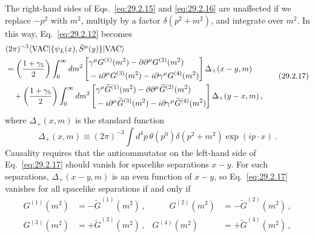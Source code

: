 The right-hand sides of Eqs.~\eqref{eq:29.2.15} and
\eqref{eq:29.2.16} are unaffected if we replace \(-p^2\) with \(m^2\),
multiply by a factor \(\delta(p^2+m^2)\), and integrate over \(m^2\).
In this way, Eq.~\eqref{eq:29.2.12} becomes
\begin{equation}
  \begin{aligned}
  &(2\pi)^{-3}
  \langle\mathrm{VAC}\lvert
    \{\psi_L(x),\bar S^\mu(y)\}
  \rvert\mathrm{VAC}\rangle
  \\
  &=
  \left(\frac{1+\gamma_5}{2}\right)
  \int_0^\infty dm^2
  \left[
  \begin{aligned}
    &\gamma^\mu G^{(1)}(m^2)
    -\sl{\partial}\partial^\mu G^{(2)}(m^2)
    \\
    &-i\partial^\mu G^{(3)}(m^2)
    -i\sl{\partial}\gamma^\mu G^{(4)}(m^2)
  \end{aligned}
  \right]\Delta_+(x-y,m)
  \\
  &\quad+
  \left(\frac{1+\gamma_5}{2}\right)
  \int_0^\infty dm^2
  \left[
  \begin{aligned}
    &\gamma^\mu\widetilde G^{(1)}(m^2)
    -\sl{\partial}\partial^\mu\widetilde G^{(2)}(m^2)
    \\
    &-i\partial^\mu\widetilde G^{(3)}(m^2)
    -i\sl{\partial}\gamma^\mu\widetilde G^{(4)}(m^2)
  \end{aligned}
  \right]\Delta_+(y-x,m)\,,
  \end{aligned}
  \tag{29.2.17}\label{eq:29.2.17}
\end{equation}
where \(\Delta_+(x,m)\) is the standard function
\begin{equation}
  \Delta_+(x,m)
  \equiv
  (2\pi)^{-3}\int d^4p\,
  \theta(p^0)\delta(p^2+m^2)\exp(ip\mathbin{\cdot}x)\,.
  \tag{29.2.18}\label{eq:29.2.18}
\end{equation}
Causality requires that the anticommutator on the left-hand side of
Eq.~\eqref{eq:29.2.17} should vanish for spacelike separations \(x-y\).
For such separations, \(\Delta_+(x-y,m)\) is an even function of \(x-y\),
so Eq.~\eqref{eq:29.2.17} vanishes for all spacelike separations if and
only if
\begin{equation}
  \begin{aligned}
  G^{(1)}(m^2)&=-\widetilde G^{(1)}(m^2)\,,
  &\qquad
  G^{(2)}(m^2)&=-\widetilde G^{(2)}(m^2)\,,
  \\
  G^{(3)}(m^2)&=+\widetilde G^{(3)}(m^2)\,,
  &
  G^{(4)}(m^2)&=+\widetilde G^{(4)}(m^2)\,,
  \end{aligned}
  \tag{29.2.19}\label{eq:29.2.19}
\end{equation}
